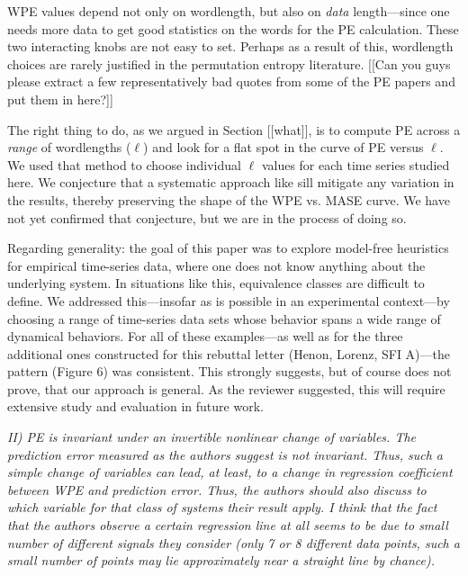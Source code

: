 \documentclass[12pt]{article}
\newcommand{\alert}[1]{{\color{red}#1}}
\begin{document}
WPE values depend not only on wordlength, but also on \emph{data}
length---since one needs more data to get good statistics on the words
for the PE calculation.  These two interacting knobs are not easy to
set.  Perhaps as a result of this, wordlength choices are rarely
justified in the permutation entropy literature.  \alert{[[Can you
      guys please extract a few representatively bad quotes from some
      of the PE papers and put them in here?]]}

The right thing to do, as we argued in Section [[what]], is to compute
PE across a \emph{range} of wordlengths ($\ell$) and look for a flat
spot in the curve of PE versus $\ell$.  We used that method to choose
individual $\ell$ values for each time series studied here.  We
conjecture that a systematic approach like sill mitigate any variation
in the results, thereby preserving the shape of the WPE vs. MASE
curve.  We have not yet confirmed that conjecture, but we are in the
process of doing so.

Regarding generality: the goal of this paper was to explore model-free
heuristics for empirical time-series data, where one does not know
anything about the underlying system.  In situations like this,
equivalence classes are difficult to define.  We addressed
this---insofar as is possible in an experimental context---by choosing
a range of time-series data sets whose behavior spans a wide range of
dynamical behaviors.  For all of these examples---as well as for the
three additional ones constructed for this rebuttal letter (Henon,
Lorenz, SFI A)---the pattern (Figure 6) was consistent.  This strongly
suggests, but of course does not prove, that our approach is general.
As the reviewer suggested, this will require extensive study and
evaluation in future work.

\smallskip

\emph{II) PE is invariant under an invertible nonlinear change of
  variables. The prediction error measured as the authors suggest is
  not invariant. Thus, such a simple change of variables can lead, at
  least, to a change in regression coefficient between WPE and
  prediction error. Thus, the authors should also discuss to which
  variable for that class of systems their result apply. I think that
  the fact that the authors observe a certain regression line at all
  seems to be due to small number of different signals they consider
  (only 7 or 8 different data points, such a small number of points
  may lie approximately near a straight line by chance).}
\end{document}
